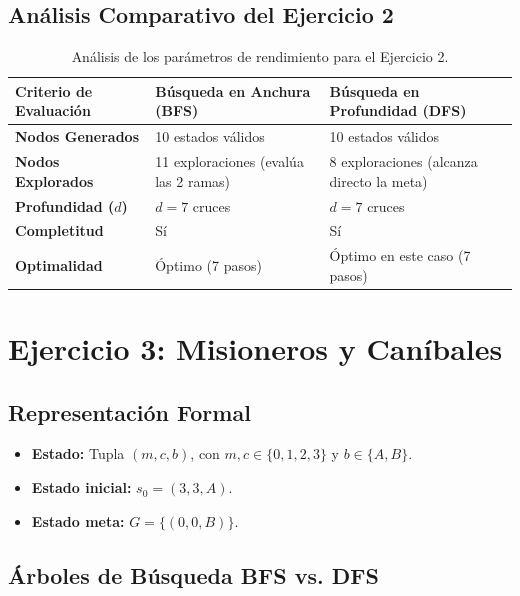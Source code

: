 \documentclass[11pt,letterpaper]{article}
\begin{document}
\subsection{Análisis Comparativo del Ejercicio 2}

\begin{table}[H]
\centering\small
\renewcommand{\arraystretch}{1.2}
\begin{tabularx}{\linewidth}{@{} l X X @{}}
\toprule
\textbf{Criterio de Evaluación} & \textbf{Búsqueda en Anchura (BFS)} & \textbf{Búsqueda en Profundidad (DFS)} \\
\midrule
\textbf{Nodos Generados} & 10 estados válidos & 10 estados válidos \\
\textbf{Nodos Explorados} & 11 exploraciones (evalúa las 2 ramas) & 8 exploraciones (alcanza directo la meta) \\
\textbf{Profundidad ($d$)} & $d = 7$ cruces & $d = 7$ cruces \\
\textbf{Completitud} & Sí & Sí \\
\textbf{Optimalidad} & Óptimo (7 pasos) & Óptimo en este caso (7 pasos) \\
\bottomrule
\end{tabularx}
\caption{Análisis de los parámetros de rendimiento para el Ejercicio 2.}
\end{table}

\section{Ejercicio 3: Misioneros y Caníbales}

\subsection{Representación Formal}
\begin{itemize}
  \item \textbf{Estado:} Tupla $(m, c, b)$, con $m, c \in \{0,1,2,3\}$ y $b \in \{A, B\}$.
  \item \textbf{Estado inicial:} $s_0 = (3,3,A)$.
  \item \textbf{Estado meta:} $G = \{(0,0,B)\}$.
\end{itemize}

\subsection{Árboles de Búsqueda BFS vs. DFS}
\end{document}
